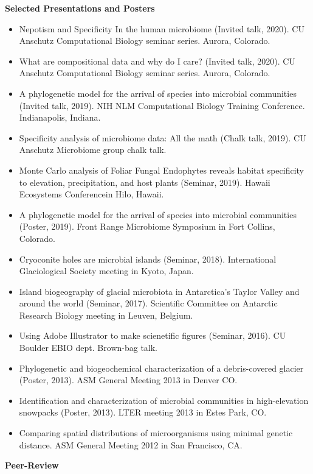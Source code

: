 \documentclass{article}
\begin{document}
\vspace{3mm}
{\large  \textbf{Selected Presentations and Posters}}
\begin{itemize}[noitemsep,topsep=0pt, leftmargin=5mm]
  \item Nepotism and Specificity In the human microbiome (Invited talk, 2020). CU Anschutz Computational Biology seminar series. Aurora, Colorado.
  \item What are compositional data and why do I care? (Invited talk, 2020). CU Anschutz Computational Biology seminar series. Aurora, Colorado.
  \item A phylogenetic model for the arrival of species into microbial communities (Invited talk, 2019). NIH NLM Computational Biology Training Conference. Indianapolis, Indiana.
  \item Specificity analysis of microbiome data: All the math (Chalk talk, 2019). CU Anschutz Microbiome group chalk talk.
  \item Monte Carlo analysis of Foliar Fungal Endophytes reveals habitat specificity to elevation, precipitation, and host plants (Seminar, 2019). Hawaii Ecosystems Conferencein  Hilo, Hawaii.
  \item A phylogenetic model for the arrival of species into microbial communities (Poster, 2019). Front Range Microbiome Symposium in Fort Collins, Colorado.
  \item Cryoconite holes are microbial islands (Seminar, 2018). International Glaciological Society meeting in Kyoto, Japan.
  \item Island biogeography of glacial microbiota in Antarctica’s Taylor Valley and around the world (Seminar, 2017). Scientific Committee on Antarctic Research Biology meeting in Leuven, Belgium.
  \item Using Adobe Illustrator to make scienetific figures (Seminar, 2016). CU Boulder EBIO dept. Brown-bag talk.
  \item Phylogenetic and biogeochemical characterization of a debris-covered glacier (Poster, 2013). ASM General Meeting 2013 in Denver CO.
  \item Identification and characterization of microbial communities in high-elevation snowpacks (Poster, 2013). LTER meeting 2013 in Estes Park, CO.
  \item Comparing spatial distributions of microorganisms using minimal genetic distance. ASM General Meeting 2012 in San Francisco, CA.
\end{itemize}
\vspace{3mm}
{\large  \textbf{Peer-Review}}\\
\end{document}
